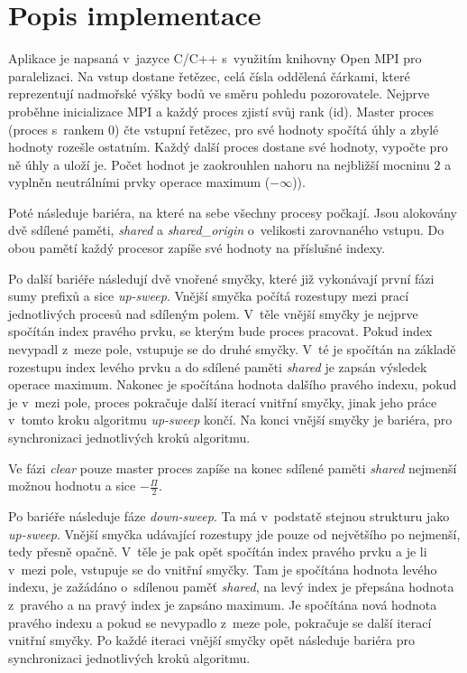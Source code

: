 \documentclass[11pt, a4paper, titlepage]{article}
\begin{document}
\section{Popis implementace}\label{sec:implementace}

Aplikace je napsaná v~jazyce C/C++ s~využitím knihovny Open MPI pro paralelizaci.
Na vstup dostane řetězec, celá čísla oddělená čárkami, které reprezentují
nadmořské výšky bodů ve směru pohledu pozorovatele.
Nejprve proběhne inicializace MPI a každý proces zjistí svůj rank (id).
Master proces (proces s~rankem 0) čte vstupní řetězec,
pro své hodnoty spočítá úhly a zbylé hodnoty rozešle ostatním.
Každý další proces dostane své hodnoty, vypočte pro ně úhly a uloží je.
Počet hodnot je zaokrouhlen nahoru na nejbližší mocninu $2$ a vyplněn
neutrálními prvky operace maximum ($-\infty$)).

Poté následuje bariéra, na které na sebe všechny procesy počkají.
Jsou alokovány dvě sdílené paměti, \textit{shared} a \textit{shared\_origin}
o~velikosti zarovnaného vstupu.
Do obou pamětí každý procesor zapíše své hodnoty na příslušné indexy.

Po další bariéře následují dvě vnořené smyčky, které již vykonávají
první fázi sumy prefixů a sice \textit{up-sweep}.
Vnější smyčka počítá rozestupy mezi prací jednotlivých procesů nad
sdíleným polem.
V~těle vnější smyčky je nejprve spočítán index pravého prvku, se kterým
bude proces pracovat.
Pokud index nevypadl z~meze pole, vstupuje se do druhé smyčky.
V~té je spočítán na základě rozestupu index levého prvku a do sdílené
paměti \textit{shared} je zapsán výsledek operace maximum.
Nakonec je spočítána hodnota dalšího pravého indexu,
pokud je v~mezi pole, proces pokračuje další iterací vnitřní smyčky,
jinak jeho práce v~tomto kroku algoritmu \textit{up-sweep} končí.
Na konci vnější smyčky je bariéra, pro synchronizaci jednotlivých
kroků algoritmu.

Ve fázi \textit{clear} pouze master proces zapíše na konec sdílené
paměti \textit{shared} nejmenší možnou hodnotu a sice $-\frac{\Pi}{2}$.

Po bariéře následuje fáze \textit{down-sweep}.
Ta má v~podstatě stejnou strukturu jako \textit{up-sweep}.
Vnější smyčka udávající rozestupy jde pouze od největšího po
nejmenší, tedy přesně opačně.
V~těle je pak opět spočítán index pravého prvku a je li
v~mezi pole, vstupuje se do vnitřní smyčky.
Tam je spočítána hodnota levého indexu, je zažádáno o~sdílenou
paměť \textit{shared}, na levý index je přepsána hodnota
z~pravého a na pravý index je zapsáno maximum.
Je spočítána nová hodnota pravého indexu a pokud se nevypadlo
z~meze pole, pokračuje se další iterací vnitřní smyčky.
Po každé iteraci vnější smyčky opět následuje bariéra pro
synchronizaci jednotlivých kroků algoritmu.
\end{document}
